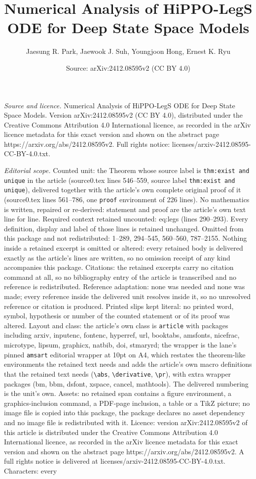 \documentclass[10pt,a4paper]{amsart}
\title[Numerical Analysis of HiPPO-LegS ODE for Deep State Space Mo]{Numerical Analysis of HiPPO-LegS ODE for Deep State Space Models}
\author{Jaesung R. Park, Jaewook J. Suh, Youngjoon Hong, Ernest K. Ryu}
\date{Source: arXiv:2412.08595v2 (CC BY 4.0)}
\begin{document}
\maketitle

\noindent\emph{Source and licence.} Numerical Analysis of HiPPO-LegS ODE for Deep State Space Models. Version arXiv:2412.08595v2 (CC BY 4.0), distributed under the Creative Commons Attribution 4.0 International licence, as recorded in the arXiv licence metadata for this exact version and shown on the abstract page https://arxiv.org/abs/2412.08595v2. Full rights notice: licenses/arxiv-2412.08595-CC-BY-4.0.txt.\par\smallskip

\noindent\textit{Editorial scope.} Counted unit: the Theorem whose source label is \texttt{thm:exist and unique} in the article (source0.tex lines 546--559, source label \texttt{thm:exist and unique}), delivered together with the article's own complete original proof of it (source0.tex lines 561--786, one \texttt{proof} environment of 226 lines). No mathematics is written, repaired or re-derived: statement and proof are the article's own text line for line. Required context retained uncounted: eq:legs (lines 290--293). Every definition, display and label of those lines is retained unchanged. Omitted from this package and not redistributed: 1--289, 294--545, 560--560, 787--2155. Nothing inside a retained excerpt is omitted or altered: every retained body is delivered exactly as the article's lines are written, so no omission receipt of any kind accompanies this package. Citations: the retained excerpts carry no citation command at all, so no bibliography entry of the article is transcribed and no reference is redistributed. Reference adaptation: none was needed and none was made; every reference inside the delivered unit resolves inside it, so no unresolved reference or citation is produced. Printed slips kept literal: no printed word, symbol, hypothesis or number of the counted statement or of its proof was altered. Layout and class: the article's own class is \texttt{article} with packages including arxiv, inputenc, fontenc, hyperref, url, booktabs, amsfonts, nicefrac, microtype, lipsum, graphicx, natbib, doi, stmaryrd; the wrapper is the lane's pinned \texttt{amsart} editorial wrapper at 10pt on A4, which restates the theorem-like environments the retained text needs and adds the article's own macro definitions that the retained text needs (\texttt{\textbackslash abs}, \texttt{\textbackslash derivative}, \texttt{\textbackslash pr}), with extra wrapper packages (bm, bbm, dsfont, xspace, cancel, mathtools). The delivered numbering is the unit's own. Assets: no retained span contains a figure environment, a graphics-inclusion command, a PDF-page inclusion, a table or a TikZ picture; no image file is copied into this package, the package declares no asset dependency and no image file is redistributed with it. Licence: version arXiv:2412.08595v2 of this article is distributed under the Creative Commons Attribution 4.0 International licence, as recorded in the arXiv licence metadata for this exact version and shown on the abstract page https://arxiv.org/abs/2412.08595v2. A full rights notice is delivered at licenses/arxiv-2412.08595-CC-BY-4.0.txt. Characters: every 
\end{document}
